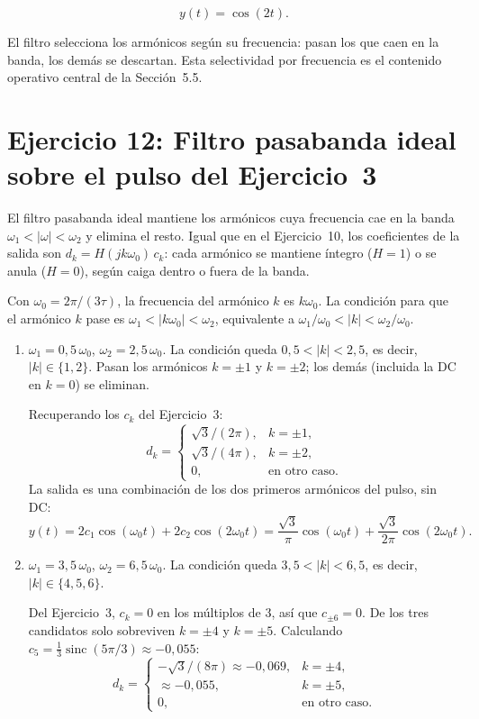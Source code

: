 \documentclass[10pt,a4paper]{article}
\begin{document}
	\[
		\boxed{y(t) = \cos(2t).}
	\]

	El filtro selecciona los armónicos según su frecuencia: pasan los que caen en la banda, los demás se descartan. Esta selectividad por frecuencia es el contenido operativo central de la Sección~5.5.

	\section*{Ejercicio 12: Filtro pasabanda ideal sobre el pulso del Ejercicio~3}

	El filtro pasabanda ideal mantiene los armónicos cuya frecuencia cae en la banda $\omega_1 < |\omega| < \omega_2$ y elimina el resto. Igual que en el Ejercicio~10, los coeficientes de la salida son $d_k = H(jk\omega_0)\,c_k$: cada armónico se mantiene íntegro ($H = 1$) o se anula ($H = 0$), según caiga dentro o fuera de la banda.

	Con $\omega_0 = 2\pi/(3\tau)$, la frecuencia del armónico $k$ es $k\omega_0$. La condición para que el armónico $k$ pase es $\omega_1 < |k\omega_0| < \omega_2$, equivalente a $\omega_1/\omega_0 < |k| < \omega_2/\omega_0$.

	\begin{enumerate}[label=\textbf{\alph*)}]
		\item $\omega_1 = 0{,}5\,\omega_0$, $\omega_2 = 2{,}5\,\omega_0$. La condición queda $0{,}5 < |k| < 2{,}5$, es decir, $|k| \in \{1, 2\}$. Pasan los armónicos $k = \pm 1$ y $k = \pm 2$; los demás (incluida la DC en $k = 0$) se eliminan.

		Recuperando los $c_k$ del Ejercicio~3:
		\[
			d_k =
			\begin{cases}
				\sqrt{3}/(2\pi), & k = \pm 1, \\
				\sqrt{3}/(4\pi), & k = \pm 2, \\
				0, & \text{en otro caso.}
			\end{cases}
		\]
		La salida es una combinación de los dos primeros armónicos del pulso, sin DC:
		\[
			y(t) = 2c_1\cos(\omega_0 t) + 2c_2\cos(2\omega_0 t)
			= \frac{\sqrt{3}}{\pi}\cos(\omega_0 t) + \frac{\sqrt{3}}{2\pi}\cos(2\omega_0 t).
		\]

		\item $\omega_1 = 3{,}5\,\omega_0$, $\omega_2 = 6{,}5\,\omega_0$. La condición queda $3{,}5 < |k| < 6{,}5$, es decir, $|k| \in \{4, 5, 6\}$.

		Del Ejercicio~3, $c_k = 0$ en los múltiplos de $3$, así que $c_{\pm 6} = 0$. De los tres candidatos solo sobreviven $k = \pm 4$ y $k = \pm 5$. Calculando $c_5 = \tfrac{1}{3}\operatorname{sinc}(5\pi/3) \approx -0{,}055$:
		\[
			d_k =
			\begin{cases}
				-\sqrt{3}/(8\pi) \approx -0{,}069, & k = \pm 4, \\
				\approx -0{,}055, & k = \pm 5, \\
				0, & \text{en otro caso.}
			\end{cases}
		\]
	\end{enumerate}
\end{document}
